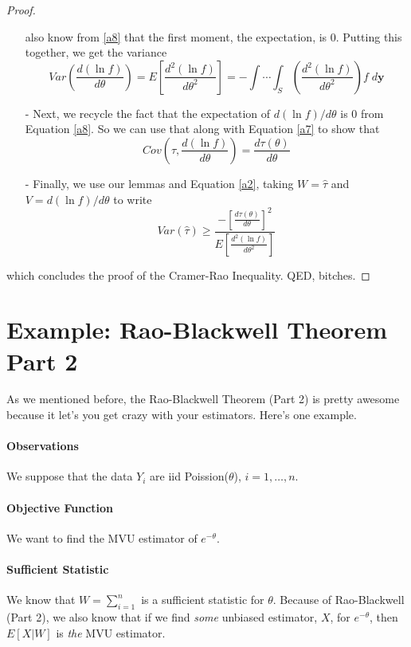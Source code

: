 \documentclass[a4paper,12pt]{scrartcl}
\begin{document}
\begin{proof}
\begin{itemize}
{	 also know from \ref{a8} that the first moment, the expectation,
	 is 0. Putting this together, we get the variance
	 \begin{equation}
	    \label{a10}
	    Var\left( \frac{d(\ln f)}{d\theta}\right) = E\left[
	       \frac{d^2(\ln f)}{d\theta^2} \right] =
	       - \int \cdots \int_S  \left(
	       \frac{d^2(\ln f)}{d\theta^2}\right) f \; d\mathbf{y}
	 \end{equation}
      }
      \item[-]{Next, we recycle the fact that the expectation of
	 $d(\ln f)/ d\theta$ is 0 from Equation \ref{a8}. So we can use
	 that along with Equation \ref{a7} to show that
	 \begin{equation}
	    \label{a11}
	    Cov\left( \hat{\tau}, \frac{d(\ln f)}{ d\theta} \right)
	    = \frac{d\tau(\theta)}{d\theta}
	 \end{equation}
	 }
      \item[-]{Finally, we use our lemmas and Equation \ref{a2}, taking
	 $W = \hat{\tau}$ and $V = d(\ln f)/ d\theta$ to write
	 \[ Var(\hat{\tau}) \geq
	    \frac{-\left[ \frac{d\tau(\theta)}{d\theta}\right]^2}{
	    E\left[ \frac{d^2(\ln f)}{d\theta^2} \right]}\]
      }
   \end{itemize}
   which concludes the proof of the Cramer-Rao Inequality. QED, bitches.
\end{proof}



\newpage
\section{Example: Rao-Blackwell Theorem Part 2}

As we mentioned before, the Rao-Blackwell Theorem (Part 2)
is pretty awesome
because it let's you get crazy with your estimators.  Here's one
example.

\paragraph{Observations} We suppose that the data $Y_i$ are iid
Poission($\theta$), $i=1,\ldots,n$.

\paragraph{Objective Function} We want to find the MVU estimator of
$e^{-\theta}$.

\paragraph{Sufficient Statistic} We know that $W = \sum^n_{i=1}$ is
a sufficient statistic for $\theta$.  Because of Rao-Blackwell (Part 2),
we also know that if we find \emph{some} unbiased estimator, $X$, for
$e^{-\theta}$, then $E[X|W]$ is \emph{the} MVU estimator.
\end{document}
